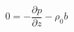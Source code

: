 \begin{equation}
    0=-\frac{\partial p}{\partial z} - \rho_0 b
\label{EQN:Hydrostatic}
\end{equation}
